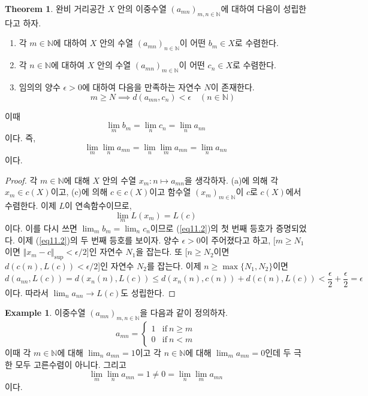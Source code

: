 \documentclass[11pt]{book}
\numberwithin{equation}{chapter}
\def\NN{\mathbb{N}}
\def\eps{\epsilon}
\newcommand{\norm}[1]{\left\Vert#1\right\Vert}
\def\textif{\text{if}}
\theoremstyle{definition}
\newtheorem{thm}{Theorem}[section]
\newtheorem*{ex}{Example}
\newenvironment{enum}
	{\begin{enumerate}[label=(\alph*), leftmargin=2\parindent]}
	{\end{enumerate}}
\begin{document}
\begin{thm}
    완비 거리공간 \(X\) 안의 이중수열 \((a_{mn})_{m,n \in \NN}\)에 대하여 다음이 성립한다고 하자.
    \begin{enum}
        \item 각 \(m \in \NN\)에 대하여 \(X\) 안의 수열 \((a_{mn})_{n \in \NN}\)이 어떤 \(b_m \in X\)로 수렴한다.
        \item 각 \(n \in \NN\)에 대하여 \(X\) 안의 수열 \((a_{mn})_{m \in \NN}\)이 어떤 \(c_n \in X\)로 수렴한다.
        \item 임의의 양수 \(\eps > 0\)에 대하여 다음을 만족하는 자연수 \(N\)이 존재한다.
        \[
            m \ge N \implies d(a_{mn}, c_n) < \eps \quad (n \in \NN)     
        \]
    \end{enum}
    이때
    \begin{equation} \label{eq11.2}
        \lim_m b_m = \lim_n c_n = \lim_{n} a_{nn}
    \end{equation}
    이다. 즉,
    \[
    \lim_m \lim_n a_{mn} = \lim_n \lim_m a_{mn} = \lim_{n} a_{nn}
    \]
    이다.
\end{thm}
\begin{proof}
    각 \(m \in \NN\)에 대해 \(X\) 안의 수열 \(x_m : n \mapsto a_{mn}\)을 생각하자. (a)에 의해 각 \(x_m \in c(X)\)이고, (c)에 의해 \(c \in c(X)\)이고 함수열 \((x_m)_{m \in \NN}\)이 \(c\)로 \(c(X)\)에서 수렴한다. 이제 \(L\)이 연속함수이므로,
    \[
    \lim_m L(x_m) = L(c)   
    \]
    이다. 이를 다시 쓰면 \(\lim_m b_m = \lim_n c_n\)이므로 (\ref{eq11.2})의 첫 번째 등호가 증명되었다. 이제 (\ref{eq11.2})의 두 번째 등호를 보이자. 양수 \(\eps > 0\)이 주어졌다고 하고, [\(m \ge N_1\)이면 \(\norm{x_m - c}_{\sup} < \eps / 2\)]인 자연수 \(N_1\)을 잡는다. 또 [\(n \ge N_2\)이면 \(d(c(n), L(c)) < \eps/2\)]인 자연수 \(N_2\)를 잡는다. 이제 \(n \ge \max\{N_1, N_2\}\)이면
    \[
    d(a_{nn}, L(c)) = d(x_n(n), L(c)) \le d(x_n(n), c(n)) + d(c(n), L(c)) < \frac{\eps}{2} + \frac{\eps}{2} = \eps
    \]
    이다. 따라서 \(\lim_n a_{nn} \to L(c)\)도 성립한다.
\end{proof}

\begin{ex}
    이중수열 \((a_{mn})_{m,n \in \NN}\)을 다음과 같이 정의하자.
    \[
    a_{mn} =    
    \begin{cases}
        1 &\textif \ n \ge m\\
        0 &\textif \ n < m
    \end{cases}
    \]
    이때 각 \(m \in \NN\)에 대해 \(\lim_n a_{mn} = 1\)이고 각 \(n \in \NN\)에 대해 \(\lim_m a_{mn} = 0\)인데 두 극한 모두 고른수렴이 아니다. 그리고
    \[
    \lim_m \lim_n a_{mn} = 1 \ne 0 = \lim_n \lim_m a_{mn}    
    \]
    이다.
\end{ex}
\end{document}
